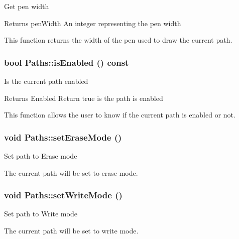 \label{classPaths_a3cd98da812b83627277d7ecdd236e0d8}
Get pen width \begin{DoxyReturn}{Returns}
penWidth An integer representing the pen width
\end{DoxyReturn}
This function returns the width of the pen used to draw the current path. \hypertarget{classPaths_a5791dac09ef3d2b369d821a2e18c59e4}{
\subsubsection[{isEnabled}]{\setlength{\rightskip}{0pt plus 5cm}bool Paths::isEnabled () const}}
\label{classPaths_a5791dac09ef3d2b369d821a2e18c59e4}
Is the current path enabled

\begin{DoxyReturn}{Returns}
Enabled Return true is the path is enabled
\end{DoxyReturn}
This function allows the user to know if the current path is enabled or not. \hypertarget{classPaths_a3087ce9e69e51f9a2dc2add3b6278761}{
\subsubsection[{setEraseMode}]{\setlength{\rightskip}{0pt plus 5cm}void Paths::setEraseMode ()}}
\label{classPaths_a3087ce9e69e51f9a2dc2add3b6278761}
Set path to Erase mode

The current path will be set to erase mode. \hypertarget{classPaths_a67b012579208e4bf513db86580d8c439}{
\subsubsection[{setWriteMode}]{\setlength{\rightskip}{0pt plus 5cm}void Paths::setWriteMode ()}}
\label{classPaths_a67b012579208e4bf513db86580d8c439}
Set path to Write mode

The current path will be set to write mode. 

